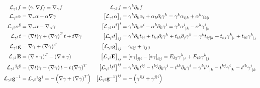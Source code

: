 \documentclass[a4paper,10pt]{scrartcl}
\newcommand{\lie}{\mathcal{L}}
\newcommand{\gb}{\mathbf{g}}
\newcommand{\Eb}{\mathbf{E}}
\begin{document}
\begin{align*}
  \lie_{\gamma^{\sharp}} f &= \left\langle \gamma , \nabla f \right\rangle = \nabla_{\gamma}f
         &\lie_{\gamma^{\sharp}}f &= \gamma^{k}\partial_{k}f \\
  \lie_{\gamma^{\sharp}} \alpha &= \nabla_{\gamma}\alpha + \alpha\nabla\gamma 
        &\left[ \lie_{\gamma^{\sharp}} \alpha \right]_{i} &= \gamma^{k}\partial_{k}\alpha_{i} + \alpha_{k}\partial_{i}\gamma^{k}
                          = \gamma^{k}\alpha_{i|k} + \alpha^{k}\gamma_{k|i}\\
  \lie_{\gamma^{\sharp}} \alpha^{\sharp} &= \nabla_{\gamma}\alpha - \nabla_{\alpha}\gamma
        &\left[ \lie_{\gamma^{\sharp}} \alpha^{\sharp} \right]^{i} &= \gamma^{k}\partial_{k}\alpha^{i} - \alpha^{k}\partial_{k}\gamma^{i}
                          =\gamma^{k}\tensor{\alpha}{^{i}_{|k}} - \alpha^{k}\tensor{\gamma}{^{i}_{|k}}\\
  \lie_{\gamma^{\sharp}}t &= (\nabla t)\gamma + \left( \nabla\gamma \right)^{T}t + t\nabla\gamma
        &\left[ \lie_{\gamma^{\sharp}}t \right]_{ij} &= \gamma^{k}\partial_{k}t_{ij} + t_{kj}\partial_{i}\gamma^{k} + t_{ik}\partial_{j}\gamma^{k}
              = \gamma^{k}t_{ij|k} + t_{kj}\tensor{\gamma}{^{k}_{|i}} +  t_{ik}\tensor{\gamma}{^{k}_{|j}}\\
  \lie_{\gamma^{\sharp}}\gb &= \nabla\gamma + \left( \nabla\gamma \right)^{T}
        &\left[ \lie_{\gamma^{\sharp}}\gb \right]_{ij} &= \gamma_{i|j} + \gamma_{j|i}\\
  \lie_{\gamma^{\sharp}}\Eb &= \left( \nabla*\gamma \right)^{T} - \left( \nabla*\gamma \right)
        &\left[ \lie_{\gamma^{\sharp}}\Eb \right]_{ij} &= \left[ *\gamma \right]_{j|i} - \left[ *\gamma \right]_{i|j}
              = E_{kj}\tensor{\gamma}{^{k}_{|i}} + E_{ik}\tensor{\gamma}{^{k}_{|j}} \\
  \lie_{\gamma^{\sharp}}\tensor[^{\sharp}]{t}{^{\sharp}} &= (\nabla t)\gamma - \left( \nabla\gamma \right)t - t\left( \nabla\gamma \right)^{T}
        &\left[ \lie_{\gamma^{\sharp}}\tensor[^{\sharp}]{t}{^{\sharp}} \right]^{ij}
            &= \gamma^{k}\partial_{k}t^{ij} - t^{kj}\partial_{k}\gamma^{i} - t^{ik}\partial_{k}\gamma^{i}
             = \gamma^{k}\tensor{t}{^{ij}_{|k}} - t^{kj}\tensor{\gamma}{^{i}_{|k}} - t^{ik}\tensor{\gamma}{^{j}_{|k}}\\
  \lie_{\gamma^{\sharp}}\gb^{-1} &= \lie_{\gamma^{\sharp}}\tensor[^{\sharp}]{\gb}{^{\sharp}} = -\left(\nabla\gamma + \left( \nabla\gamma \right)^{T}\right)
        &\left[ \lie_{\gamma^{\sharp}}\gb^{-1} \right]^{ij} &= -\left(\gamma^{i|j} + \gamma^{j|i}\right)\\

\end{align*}
\end{document}
